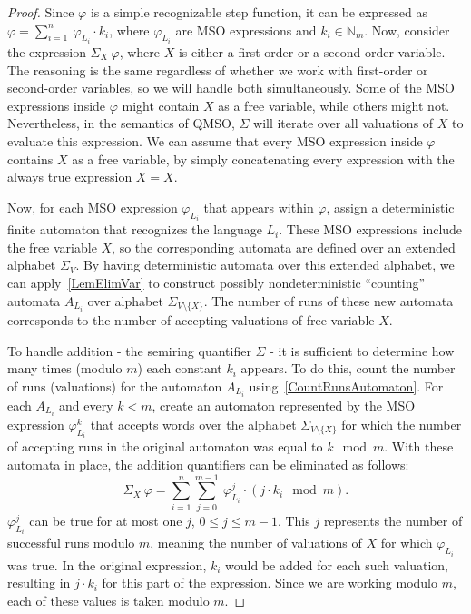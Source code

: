 \documentclass[en]{pracamgr}
\theoremstyle{definition}
\begin{document}
\begin{proof}
    Since $\varphi$ is a simple recognizable step function, it can be expressed as $\varphi = \sum_{i = 1}^{n} \ \varphi_{L_i} \cdot k_i$, where $\varphi_{L_i}$ are MSO expressions and $k_i \in \mathbb{N}_m$. Now, consider the expression $\Sigma_{X} \ \varphi$, where $X$ is either a first-order or a second-order variable. The reasoning is the same regardless of whether we work with first-order or second-order variables, so we will handle both simultaneously. Some of the MSO expressions inside $\varphi$ might contain $X$ as a free variable, while others might not. Nevertheless, in the semantics of QMSO, $\Sigma$ will iterate over all valuations of $X$ to evaluate this expression. We can assume that every MSO expression inside $\varphi$ contains $X$ as a free variable, by simply concatenating every expression with the always true expression $X = X$.

    Now, for each MSO expression $\varphi_{L_i}$ that appears within $\varphi$, assign a deterministic finite automaton that recognizes the language $L_i$. These MSO expressions include the free variable $X$, so the corresponding automata are defined over an extended alphabet $\Sigma_V$. By having deterministic automata over this extended alphabet, we can apply~\cref{LemElimVar} to construct possibly nondeterministic ``counting'' automata $A_{L_i}$ over alphabet $\Sigma_{V \setminus \{X\}}$. The number of runs of these new automata corresponds to the number of accepting valuations of free variable $X$.

    To handle addition - the semiring quantifier $\Sigma$ - it is sufficient to determine how many times (modulo $m$) each constant $k_i$ appears. To do this, count the number of runs (valuations) for the automaton $A_{L_i}$ using~\cref{CountRunsAutomaton}. For each $A_{L_i}$ and every $k < m$, create an automaton represented by the MSO expression $\varphi_{L_i}^k$ that accepts words over the alphabet $\Sigma_{V \setminus \{X\}}$ for which the number of accepting runs in the original automaton was equal to $k \mod m$. With these automata in place, the addition quantifiers can be eliminated as follows:
    $$\Sigma_X \ \varphi = \sum_{i = 1}^n \sum_{j = 0}^{m-1} \ \varphi_{L_i}^j \cdot (j \cdot k_i \mod m).$$
    $\varphi_{L_i}^j$ can be true for at most one $j$, $0 \leq j \leq m-1$. This $j$ represents the number of successful runs modulo $m$, meaning the number of valuations of $X$ for which $\varphi_{L_i}$ was true. In the original expression, $k_i$ would be added for each such valuation, resulting in $j \cdot k_i$ for this part of the expression. Since we are working modulo $m$, each of these values is taken modulo $m$.
\end{proof}
\end{document}

